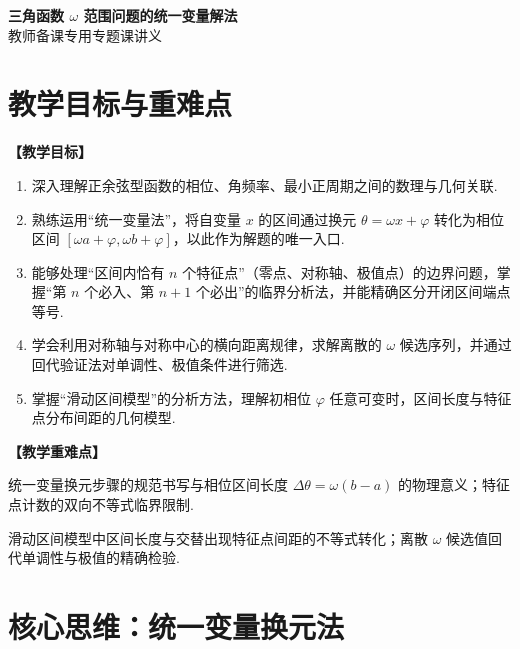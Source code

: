 \documentclass[11pt,a4paper]{ctexart}
\begin{document}
\begin{center}
  {\Large\bfseries 三角函数 $\omega$ 范围问题的统一变量解法}\\
  \vspace{0.6em}
  {\large 教师备课专用\quad 专题课讲义}
\end{center}

\section{教学目标与重难点}
\textbf{【教学目标】}
\begin{enumerate}[label=\arabic*. , leftmargin=2em, itemsep=0.1em, topsep=0.2em]
  \item 深入理解正余弦型函数的相位、角频率、最小正周期之间的数理与几何关联.
  \item 熟练运用“统一变量法”，将自变量 $x$ 的区间通过换元 $\theta = \omega x + \varphi$ 转化为相位区间 $[\omega a + \varphi, \omega b + \varphi]$，以此作为解题的唯一入口.
  \item 能够处理“区间内恰有 $n$ 个特征点”（零点、对称轴、极值点）的边界问题，掌握“第 $n$ 个必入、第 $n+1$ 个必出”的临界分析法，并能精确区分开闭区间端点等号.
  \item 学会利用对称轴与对称中心的横向距离规律，求解离散的 $\omega$ 候选序列，并通过回代验证法对单调性、极值条件进行筛选.
  \item 掌握“滑动区间模型”的分析方法，理解初相位 $\varphi$ 任意可变时，区间长度与特征点分布间距的几何模型.
\end{enumerate}

\vspace{0.8em}
\textbf{【教学重难点】}
\begin{description}[leftmargin=2em, itemsep=0.1em, topsep=0.2em]
  \item[重点] 统一变量换元步骤的规范书写与相位区间长度 $\Delta\theta = \omega(b-a)$ 的物理意义；特征点计数的双向不等式临界限制.
  \item[难点] 滑动区间模型中区间长度与交替出现特征点间距的不等式转化；离散 $\omega$ 候选值回代单调性与极值的精确检验.
\end{description}

\newpage

\section{核心思维：统一变量换元法}
\end{document}
